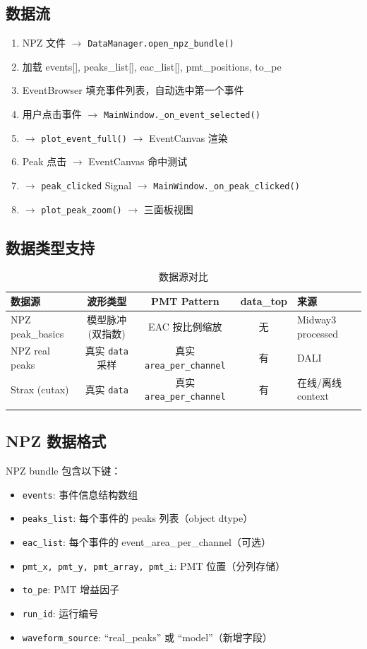 \documentclass[12pt,a4paper]{article}
\begin{document}
\subsection{数据流}

\begin{enumerate}[itemsep=3pt]
\item NPZ 文件 $\rightarrow$ \texttt{DataManager.open\_npz\_bundle()}
\item 加载 events[], peaks\_list[], eac\_list[], pmt\_positions, to\_pe
\item EventBrowser 填充事件列表，自动选中第一个事件
\item 用户点击事件 $\rightarrow$ \texttt{MainWindow.\_on\_event\_selected()}
\item $\rightarrow$ \texttt{plot\_event\_full()} $\rightarrow$ EventCanvas 渲染
\item Peak 点击 $\rightarrow$ EventCanvas 命中测试
\item $\rightarrow$ \texttt{peak\_clicked} Signal $\rightarrow$ \texttt{MainWindow.\_on\_peak\_clicked()}
\item $\rightarrow$ \texttt{plot\_peak\_zoom()} $\rightarrow$ 三面板视图
\end{enumerate}

\subsection{数据类型支持}

\begin{longtable}{|l|c|c|c|p{3cm}|}
\hline
\textbf{数据源} & \textbf{波形类型} & \textbf{PMT Pattern} & \textbf{data\_top} & \textbf{来源} \\
\hline
NPZ peak\_basics & 模型脉冲 (双指数) & EAC 按比例缩放 & 无 & Midway3 processed \\
NPZ real peaks & 真实 \texttt{data} 采样 & 真实 \texttt{area\_per\_channel} & 有 & DALI \\
Strax (cutax) & 真实 \texttt{data} & 真实 \texttt{area\_per\_channel} & 有 & 在线/离线 context \\
\hline
\caption{数据源对比}
\end{longtable}

\subsection{NPZ 数据格式}

NPZ bundle 包含以下键：
\begin{itemize}[itemsep=2pt]
\item \texttt{events}: 事件信息结构数组
\item \texttt{peaks\_list}: 每个事件的 peaks 列表（object dtype）
\item \texttt{eac\_list}: 每个事件的 event\_area\_per\_channel（可选）
\item \texttt{pmt\_x, pmt\_y, pmt\_array, pmt\_i}: PMT 位置（分列存储）
\item \texttt{to\_pe}: PMT 增益因子
\item \texttt{run\_id}: 运行编号
\item \texttt{waveform\_source}: ``real\_peaks'' 或 ``model''（新增字段）
\end{itemize}
\end{document}
